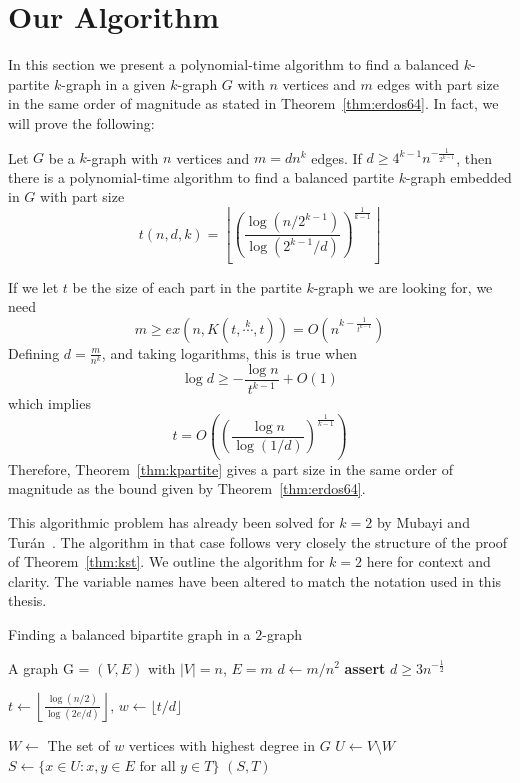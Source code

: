 \section{Our Algorithm}\label{sec:algorithm}

In this section we present a polynomial-time algorithm to find a balanced $k$-partite
$k$-graph in a given $k$-graph $G$
with $n$ vertices and $m$ edges with part size in the same order of magnitude as stated in
Theorem~\ref{thm:erdos64}.
In fact, we will prove the following:

\begin{theorem}\label{thm:kpartite}
    Let $G$ be a $k$-graph with $n$ vertices and $m = dn^k$ edges.
    If $d \geq 4^{k-1} n^{-\frac{1}{2^{k-1}}}$, then there is a polynomial-time algorithm
    to find a balanced partite $k$-graph embedded in $G$ with part size
    \[
        t (n, d, k) = \left\lfloor
        \left(  \frac{\log (n/2^{k-1})}{\log (2^{k-1}/d)} \right)
        ^{\frac{1}{k-1}} \right\rfloor
    \]
\end{theorem}

\begin{remark}
    If we let $t$ be the size of each part in the partite $k$-graph we are looking for, we need
    \[
        m \geq ex(n, K(t, \overset{k}{\cdots}, t)) = O\left(n^{k - \frac{1}{t^{k-1}}}\right)
    \]
    Defining $d = \frac{m}{n^k}$, and taking logarithms, this is true when
    \[
        \log d \geq - \frac{\log n}{t^{k-1}} + O(1)
    \]
    which implies
    \[
        t = O\left(\left(\frac{\log n}{\log (1/d)}\right)^{\frac{1}{k-1}}\right)
    \]
    Therefore, Theorem~\ref{thm:kpartite} gives a part size in the same order of magnitude as the bound
    given by Theorem~\ref{thm:erdos64}.
\end{remark}

This algorithmic problem has already been solved for $k = 2$ by Mubayi and Turán~\cite{MUBAYI2010174}.
The algorithm in that case follows very closely the structure of the proof of Theorem~\ref{thm:kst}.
We outline the algorithm for $k = 2$ here for context and clarity.
The variable names have been altered to match the notation used in this thesis.

\begin{algorithm}
    \caption{Finding a balanced bipartite graph in a $2$-graph}
    \label{alg:bipartite}
        \begin{algorithmic}[1]
        \Require A graph G = $(V, E)$ with $|V| = n$, $E = m$
        \State $d \gets m / n^2 $
        \State \textbf{assert} $d \geq 3 n^{-\frac{1}{2}}$

        \State $t \gets \left\lfloor\frac{\log (n/2) }
        {\log (2e/d)}\right\rfloor,\, w \gets \lfloor t/d \rfloor$

        \State $W \gets $ The set of $w$ vertices with highest degree in $G$
        \State $U \gets V \setminus W$
            \State $S \gets \{x \in U : {x, y} \in E \text{ for all } y \in T\}$
                \State \Return $(S, T)$
            \EndIf
        \EndFor
        \end{algorithmic}
\end{algorithm}


